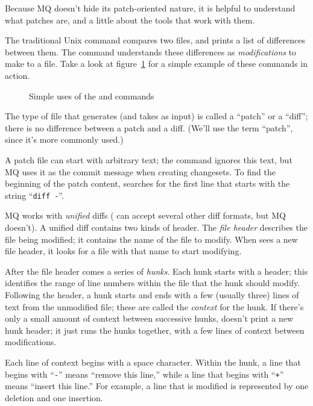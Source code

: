 Because MQ doesn't hide its patch-oriented nature, it is helpful to
understand what patches are, and a little about the tools that work
with them.

The traditional Unix  command compares two files, and
prints a list of differences between them. The  command
understands these differences as \emph{modifications} to make to a
file.  Take a look at figure~\ref{ex:mq:diff} for a simple example of
these commands in action.

\begin{figure}[ht]
  \caption{Simple uses of the  and  commands}
  \label{ex:mq:diff}
\end{figure}

The type of file that  generates (and 
takes as input) is called a ``patch'' or a ``diff''; there is no
difference between a patch and a diff.  (We'll use the term ``patch'',
since it's more commonly used.)

A patch file can start with arbitrary text; the 
command ignores this text, but MQ uses it as the commit message when
creating changesets.  To find the beginning of the patch content,
 searches for the first line that starts with the
string ``\texttt{diff~-}''.

MQ works with \emph{unified} diffs ( can accept several
other diff formats, but MQ doesn't).  A unified diff contains two
kinds of header.  The \emph{file header} describes the file being
modified; it contains the name of the file to modify.  When
 sees a new file header, it looks for a file with that
name to start modifying.

After the file header comes a series of \emph{hunks}.  Each hunk
starts with a header; this identifies the range of line numbers within
the file that the hunk should modify.  Following the header, a hunk
starts and ends with a few (usually three) lines of text from the
unmodified file; these are called the \emph{context} for the hunk.  If
there's only a small amount of context between successive hunks,
 doesn't print a new hunk header; it just runs the hunks
together, with a few lines of context between modifications.

Each line of context begins with a space character.  Within the hunk,
a line that begins with ``\texttt{-}'' means ``remove this line,''
while a line that begins with ``\texttt{+}'' means ``insert this
line.''  For example, a line that is modified is represented by one
deletion and one insertion.


